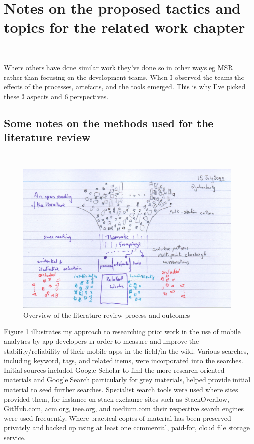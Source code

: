 \section{Notes on the proposed tactics and topics for the related work chapter}~\label{rw-proposed-tactics-and-topics-for-this-chapter}

Where others have done similar work they've done so in other ways eg MSR rather than focusing on the development teams. When I observed the teams the effects of the processes, artefacts, and the tools emerged. This is why I've picked these 3 aspects and 6 perspectives. 

\subsection{Some notes on the methods used for the literature review}~\label{rw-notes-on-methods-used-for-literature-review-topic}

\begin{figure}
    \centering
    \includegraphics[width=\textwidth]{images/rough-sketches/literature-review-overview.jpeg}
    \caption{Overview of the literature review process and outcomes}
    \label{fig:literature-review-overview}
\end{figure}

Figure \ref{fig:literature-review-overview} illustrates my approach to researching prior work in the use of mobile analytics by app developers in order to measure and improve the stability/reliability of their mobile apps in the field/in the wild. Various searches, including keyword, tags, and related items, were incorporated into the searches. Initial sources included Google Scholar to find the more research oriented materials and Google Search particularly for grey materials, helped provide initial material to seed further searches. Specialist search tools were used where sites provided them, for instance on stack exchange sites such as StackOverflow, GitHub.com, acm.org, ieee.org, and medium.com their respective search engines were used frequently. Where practical copies of material has been preserved privately and backed up using at least one commercial, paid-for, cloud file storage service.

